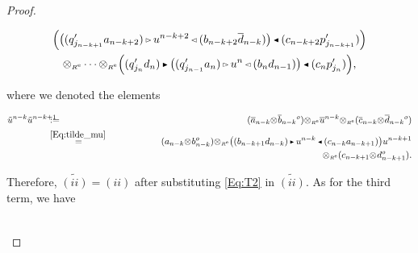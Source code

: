 \documentclass[reqno, a4paper, 10pt]{amsart}
\numberwithin{equation}{section}
\theoremstyle{plain}
\theoremstyle{definition}
\theoremstyle{remark}
\begin{document}
\begin{proof}
\begin{footnotesize}
\begin{multline*}
 \Big( {\big( {(q_{j_{n-k+1}}'a_{n-k+2}){{\,\raise1pt\hbox{$\scriptscriptstyle{\rhd}$} \, }} u^{n-k+2} {{\,\raise1pt\hbox{$\scriptscriptstyle{\lhd}$} \, }} (b_{n-k+2}{\overline{{d}}}_{n-k}) } \big)}{{\,\raise1pt\hbox{$\scriptscriptstyle{\blacktriangleleft}$} \, }}(c_{n-k+2}p_{j_{n-k+1}}')\Big)  \\
{\otimes_{\scriptscriptstyle{{\scriptscriptstyle{{R^{\rm e}}}}}}}\cdots {\otimes_{\scriptscriptstyle{{\scriptscriptstyle{{R^{\rm e}}}}}}} \Big((q_{j_n}'d_n) {{\,\raise1pt\hbox{$\scriptscriptstyle{\blacktriangleright}$} \, }} {\big( {(q_{j_{n-1}}'a_n){{\,\raise1pt\hbox{$\scriptscriptstyle{\rhd}$} \, }} u^{n}{{\,\raise1pt\hbox{$\scriptscriptstyle{\lhd}$} \, }}(b_nd_{n-1})} \big)}{{\,\raise1pt\hbox{$\scriptscriptstyle{\blacktriangleleft}$} \, }} (c_np_{j_n}')\Big), 
\end{multline*}
\end{footnotesize}
where we denoted the elements 
\begin{footnotesize}
\begin{eqnarray} 
 {\tilde{{u}}}^{n-k} {\tilde{{u}}}^{n-k+1} &\!\!\!\!\!\!:=&\!\!\!\!\!\! ({\overline{{a}}}_{n-k}{\otimes_{\scriptscriptstyle{{}}}}{\overline{{b}}}_{n-k}{}^o){\otimes_{\scriptscriptstyle{{\scriptscriptstyle{{R^{\rm e}}}}}}}{\overline{{u}}}^{n-k}{\otimes_{\scriptscriptstyle{{\scriptscriptstyle{{R^{\rm e}}}}}}}({\overline{{c}}}_{n-k}{\otimes_{\scriptscriptstyle{{}}}}{\overline{{d}}}_{n-k}{}^o) 
\nonumber \\
\label{Eq:T2}
&\!\!\!\!\!\!\overset{\eqref{Eq:tilde_mu}}{\,=}&\!\!\!\!\!\!  (a_{n-k}{\otimes_{\scriptscriptstyle{{}}}}b_{n-k}^o){\otimes_{\scriptscriptstyle{{\scriptscriptstyle{{R^{\rm e}}}}}}} {\big( {(b_{n-k+1}d_{n-k}) {{\,\raise1pt\hbox{$\scriptscriptstyle{\blacktriangleright}$} \, }} u^{n-k} {{\,\raise1pt\hbox{$\scriptscriptstyle{\blacktriangleleft}$} \, }} (c_{n-k}a_{n-k+1})} \big)}  u^{n-k+1} \\
\nonumber
&& \hspace*{8cm} {\otimes_{\scriptscriptstyle{{\scriptscriptstyle{{R^{\rm e}}}}}}}(c_{n-k+1}{\otimes_{\scriptscriptstyle{{}}}}d_{n-k+1}^o). 
\end{eqnarray}
\end{footnotesize}
Therefore, $\widetilde{(ii)} = (ii)$ after substituting 
\eqref{Eq:T2} in $\widetilde{(ii)}$.
As for the third term, we have
\begin{footnotesize}
\begin{eqnarray*}

\end{eqnarray*}
\end{footnotesize}
\end{proof}
\end{document}
